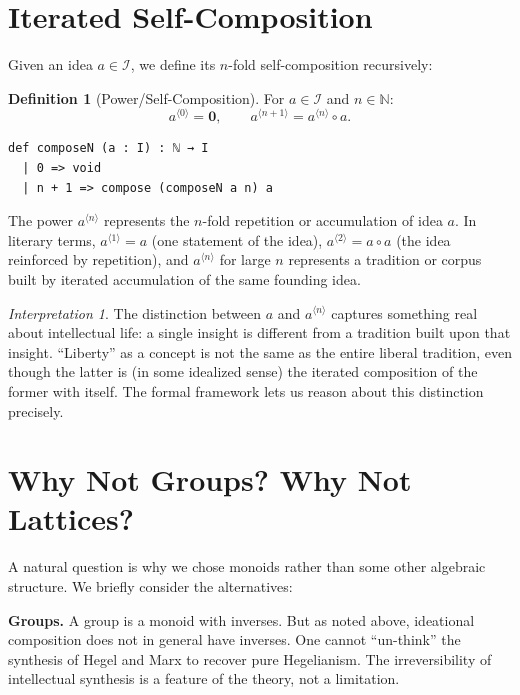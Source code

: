 \documentclass[11pt,openany]{book}
\theoremstyle{definition}
\newtheorem{definition}[axiom]{Definition}
\theoremstyle{plain}
\theoremstyle{remark}
\newtheorem{interpretation}[axiom]{Interpretation}
\newcommand{\IS}{\mathcal{I}}               %
\newcommand{\compose}{\circ}                 %
\newcommand{\void}{\mathbf{0}}              %
\newcommand{\compN}[2]{#1^{\langle #2 \rangle}} %
\begin{document}
\section{Iterated Self-Composition}

Given an idea $a \in \IS$, we define its $n$-fold self-composition recursively:

\begin{definition}[Power/Self-Composition]
\label{def:composeN}
For $a \in \IS$ and $n \in \mathbb{N}$:
\[
\compN{a}{0} = \void, \qquad \compN{a}{n+1} = \compN{a}{n} \compose a.
\]
\end{definition}

\begin{lstlisting}
def composeN (a : I) : ℕ → I
  | 0 => void
  | n + 1 => compose (composeN a n) a
\end{lstlisting}

The power $\compN{a}{n}$ represents the $n$-fold repetition or accumulation of idea $a$. In literary terms, $\compN{a}{1} = a$ (one statement of the idea), $\compN{a}{2} = a \compose a$ (the idea reinforced by repetition), and $\compN{a}{n}$ for large $n$ represents a tradition or corpus built by iterated accumulation of the same founding idea.

\begin{interpretation}
The distinction between $a$ and $\compN{a}{n}$ captures something real about intellectual life: a single insight is different from a tradition built upon that insight. ``Liberty'' as a concept is not the same as the entire liberal tradition, even though the latter is (in some idealized sense) the iterated composition of the former with itself. The formal framework lets us reason about this distinction precisely.
\end{interpretation}

\section{Why Not Groups? Why Not Lattices?}

A natural question is why we chose monoids rather than some other algebraic structure. We briefly consider the alternatives:

\textbf{Groups.} A group is a monoid with inverses. But as noted above, ideational composition does not in general have inverses. One cannot ``un-think'' the synthesis of Hegel and Marx to recover pure Hegelianism. The irreversibility of intellectual synthesis is a feature of the theory, not a limitation.
\end{document}
